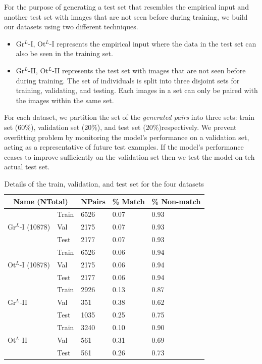 For the purpose of generating a test set that resembles the empirical input and another test set with images that are not seen before during training, we build our datasets using two different techniques.
\begin{itemize}
  \item Gr$^{L}$-I, Ot$^{L}$-I represents the empirical input where the data in the test set can also be seen in the training set.
  \item Gr$^{L}$-II, Ot$^{L}$-II represents the test set with images that are not seen before during training. The set of individuals is split into three disjoint sets for training, validating, and testing. Each images in a set can only be paired with the images within the same set.
\end{itemize}


For each dataset, we partition the set of the \emph{generated pairs} into three sets: train set (60\%), validation set (20\%), and test set (20\%)respectively. We prevent overfitting problem by monitoring the model’s performance on a validation set, acting as a representative of future test examples. If the model’s performance ceases to improve sufficiently on the validation set then we test the model on teh actual test set.


\begin{table}[t]
\captionsetup{justification=centering}
  \caption{Details of the train, validation, and test set for the four datasets}
\centering
  \begin{tabular}{lllll}
    \toprule
    \multicolumn{2}{c}{Name (NTotal)}      & NPairs & \% Match & \% Non-match \\
    \midrule
    \multirow{3}{*}{Gr$^{L}$-I (10878)}  & Train & 6526 & 0.07 & 0.93 \\
\cmidrule{2-5}
                                 & Val   & 2175 & 0.07 & 0.93 \\
\cmidrule{2-5}
                          & Test  & 2177 & 0.07 & 0.93 \\
\hline
\multirow{3}{*}{Ot$^{L}$-I (10878)}  & Train & 6526 & 0.06 & 0.94 \\
\cmidrule{2-5}
                                 & Val   & 2175 & 0.06 & 0.94 \\
\cmidrule{2-5}
                                 & Test  & 2177 & 0.06 & 0.94 \\
\hline
  \multirow{3}{*}{Gr$^{L}$-II} & Train & 2926 & 0.13 & 0.87\\
\cmidrule{2-5}
                                 & Val   & 351 & 0.38 & 0.62\\
\cmidrule{2-5}
                                 & Test  & 1035 & 0.25 & 0.75\\
    \hline
    \multirow{3}{*}{Ot$^{L}$-II} & Train & 3240 & 0.10 & 0.90\\
\cmidrule{2-5}
                                 & Val   & 561 & 0.31 & 0.69\\
\cmidrule{2-5}
                                 & Test  & 561& 0.26 & 0.73\\
    \bottomrule
  \end{tabular}
\end{table}